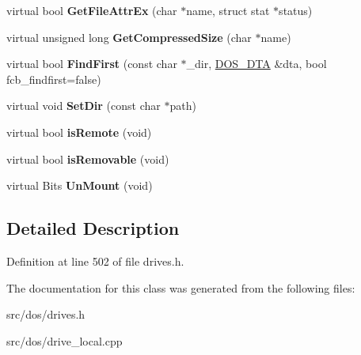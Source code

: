 \begin{DoxyCompactItemize}
\item 
\hypertarget{classcdromDrive_a901160b82788a416ffc8809c1a5e8140}{virtual bool {\bfseries Get\-File\-Attr\-Ex} (char $\ast$name, struct stat $\ast$status)}\label{classcdromDrive_a901160b82788a416ffc8809c1a5e8140}

\item 
\hypertarget{classcdromDrive_ae22f7aacee8025b67832ece7ef7cc250}{virtual unsigned long {\bfseries Get\-Compressed\-Size} (char $\ast$name)}\label{classcdromDrive_ae22f7aacee8025b67832ece7ef7cc250}

\item 
\hypertarget{classcdromDrive_afd0347b272659c24f6f3cd9b7b05f89c}{virtual bool {\bfseries Find\-First} (const char $\ast$\-\_\-dir, \hyperlink{classDOS__DTA}{D\-O\-S\-\_\-\-D\-T\-A} \&dta, bool fcb\-\_\-findfirst=false)}\label{classcdromDrive_afd0347b272659c24f6f3cd9b7b05f89c}

\item 
\hypertarget{classcdromDrive_a3aeeb35dbd5100a4b973aa6341295521}{virtual void {\bfseries Set\-Dir} (const char $\ast$path)}\label{classcdromDrive_a3aeeb35dbd5100a4b973aa6341295521}

\item 
\hypertarget{classcdromDrive_a2186d681041aad9456c57cd4be5cc0bc}{virtual bool {\bfseries is\-Remote} (void)}\label{classcdromDrive_a2186d681041aad9456c57cd4be5cc0bc}

\item 
\hypertarget{classcdromDrive_ab96402d6d61617f26d545268e1127a07}{virtual bool {\bfseries is\-Removable} (void)}\label{classcdromDrive_ab96402d6d61617f26d545268e1127a07}

\item 
\hypertarget{classcdromDrive_a4e5d16dc2a6171b622ed815b464f1114}{virtual Bits {\bfseries Un\-Mount} (void)}\label{classcdromDrive_a4e5d16dc2a6171b622ed815b464f1114}

\end{DoxyCompactItemize}


\subsection{Detailed Description}


Definition at line 502 of file drives.\-h.



The documentation for this class was generated from the following files\-:\begin{DoxyCompactItemize}
\item 
src/dos/drives.\-h\item 
src/dos/drive\-\_\-local.\-cpp\end{DoxyCompactItemize}
